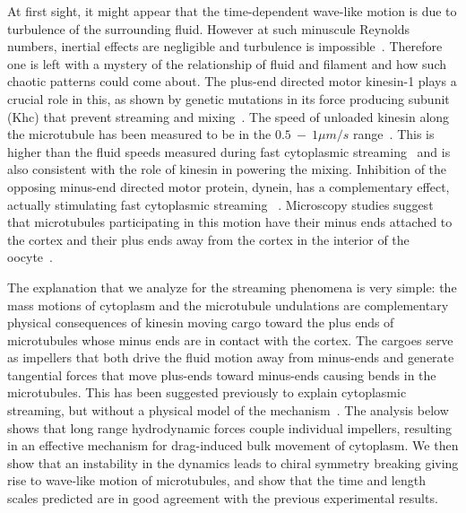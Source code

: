 \documentclass[pre,showpacs]{revtex4}
\begin{document}
At first sight, it might appear that the time-dependent wave-like
motion is due to turbulence of the surrounding fluid. However at such minuscule Reynolds
numbers, inertial effects are negligible and turbulence is
impossible~\cite{BergRandomWalksinBiology}. Therefore one is left with a mystery of
the relationship of fluid and filament and
how such chaotic patterns could come about. The plus-end
directed motor kinesin-1 plays a crucial role in this, as
shown by 
genetic mutations in its force producing subunit (Khc)  that prevent streaming and mixing~\cite{SerbusSaxton}.
The speed of unloaded kinesin along the microtubule has been
measured to be in the $0.5 ~-~ 1 \mu m/s$ range~\cite{SvobodaBlock,MeyhoferHoward}.  This is higher
than the fluid speeds measured during fast cytoplasmic streaming~\cite{SerbusSaxton}
and is also consistent with the role of kinesin in powering
the mixing.
Inhibition of the opposing minus-end directed motor protein,
dynein, has a complementary effect,
actually stimulating fast cytoplasmic streaming ~\cite{SerbusSaxton}.  Microscopy studies
suggest that microtubules participating in this motion have their
minus ends attached to the cortex and their plus ends away from
the cortex in the interior of the oocyte~\cite{SerbusSaxton,ChaSerbus}.  

The explanation
that we analyze for the streaming phenomena is very simple: the
mass motions of cytoplasm and the microtubule undulations are complementary
physical consequences of kinesin moving cargo 
toward the plus ends of microtubules whose minus ends
are in contact with the cortex. The cargoes serve as impellers that
both drive the fluid motion away from minus-ends and generate
tangential forces that move plus-ends toward minus-ends causing
bends in the microtubules. This has been suggested previously to
explain cytoplasmic streaming, but without a physical model of the
mechanism~\cite{SerbusSaxton}. The analysis below shows that long range hydrodynamic
forces couple individual impellers, resulting in an effective
mechanism for drag-induced bulk movement of cytoplasm.  We then
show that an instability in the dynamics leads to chiral symmetry breaking giving rise to
wave-like motion of microtubules, and show that the time and length scales
predicted are in good agreement with the previous experimental
results.
\end{document}
